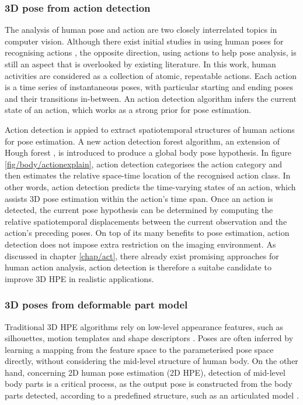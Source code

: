 \subsubsection{3D pose from action detection} 

The analysis of human pose and action are two closely interrelated topics in computer vision. Although there exist initial studies in using human poses for recognising actions \eg \cite{Yao2012, Wang2012}, the opposite direction, \ie using actions to help pose analysis, 
is still an aspect that is overlooked by existing literature. 
In this work, human activities are considered as a collection of atomic, repeatable actions. 
Each action is a time series of instantaneous poses, with particular starting and ending poses and their transitions in-between. 
An action detection algorithm infers the current state of an action, which works as a strong prior for pose estimation.   

Action detection is appied to extract spatiotemporal structures of human actions for pose estimation. A new action detection forest algorithm, an extension of Hough forest \cite{Gall2009}, is introduced to produce a global body pose hypothesis.   
In figure \ref{fig/body/actionexplain}, action detection categorises the action category and then estimates the relative space-time location of the recognised action class. In other words, action detection predicts the time-varying states of an action, which assists 3D pose estimation within the action's time span. Once an action is detected, the current pose hypothesis can be determined by computing the relative spatiotemporal displacements between the current observation and the action's preceding poses.   
On top of its many benefits to pose estimation, action detection does not impose extra restriction on the imaging environment. As discussed in chapter \ref{chap/act}, there already exist promising approaches for human action analysis, action detection is therefore a suitabe candidate to improve 3D HPE in realistic applications.   

\subsubsection{3D poses from deformable part model} 

Traditional 3D HPE algorithms rely on low-level appearance features, such as silhouettes, motion templates and shape descriptors \cite{Hogg1983, Rogez2012, Navaratnam2006, Pons-Moll2011, Sigal2012}. Poses are often inferred by learning a mapping from the feature space to the parameterised pose space directly, without considering the mid-level structure of human body.  
On the other hand, concerning 2D human pose estimation (2D HPE), detection of mid-level body parts is a critical process, as the output pose is constructed from the body parts detected, according to a predefined structure, such as an articulated model \cite{Felzenszwalb2000, Andriluka2009, Yang2011, Eichner2012}.


